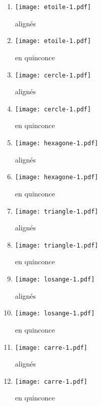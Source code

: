 \begin{minipage}[t]{7cm}
\begin{enumerate}
\item \begin{minipage}{1.75cm}\texttt{[image: etoile-1.pdf]}\end{minipage} alignés
\item \begin{minipage}{1.75cm}\texttt{[image: etoile-1.pdf]}\end{minipage} en quinconce
\item \begin{minipage}{1.75cm}\texttt{[image: cercle-1.pdf]}\end{minipage} alignés
\item \begin{minipage}{1.75cm}\texttt{[image: cercle-1.pdf]}\end{minipage} en quinconce
\item \begin{minipage}{1.75cm}\texttt{[image: hexagone-1.pdf]}\end{minipage} alignés
\item \begin{minipage}{1.75cm}\texttt{[image: hexagone-1.pdf]}\end{minipage} en quinconce
\item \begin{minipage}{1.75cm}\texttt{[image: triangle-1.pdf]}\end{minipage} alignés
\item \begin{minipage}{1.75cm}\texttt{[image: triangle-1.pdf]}\end{minipage} en quinconce
\item \begin{minipage}{1.75cm}\texttt{[image: losange-1.pdf]}\end{minipage} alignés
\item \begin{minipage}{1.75cm}\texttt{[image: losange-1.pdf]}\end{minipage} en quinconce
\item \begin{minipage}{1.75cm}\texttt{[image: carre-1.pdf]}\end{minipage} alignés
\item \begin{minipage}{1.75cm}\texttt{[image: carre-1.pdf]}\end{minipage} en quinconce
\end{enumerate}
\end{minipage}

